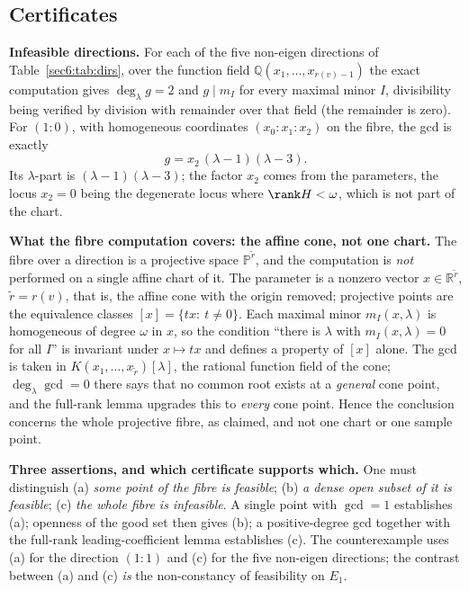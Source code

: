 \subsection{Certificates}\label{sec6:sub:cert}

\textbf{Infeasible directions.} For each of the five non-eigen directions of Table~\ref{sec6:tab:dirs},
over the function field $\mathbb{Q}(x_1,\dots,x_{r(v)-1})$ the exact computation gives
$\deg_\lambda g=2$ and $g\mid m_I$ for every maximal minor $I$, divisibility being verified by division
with remainder over that field (the remainder is zero). For $(1\!:\!0)$, with homogeneous coordinates
$(x_0\!:\!x_1\!:\!x_2)$ on the fibre, the gcd is exactly
\begin{equation}\label{sec6:eq:gexplicit}
g=x_2\,(\lambda-1)(\lambda-3).
\end{equation}
Its $\lambda$-part is $(\lambda-1)(\lambda-3)$; the factor $x_2$ comes from the parameters, the locus
$x_2=0$ being the degenerate locus where $\rank H<\omega$, which is not part of the chart.

\textbf{What the fibre computation covers: the affine cone, not one chart.} The fibre over a direction
is a projective space $\mathbb P^{\tilde r}$, and the computation is \emph{not} performed on a single
affine chart of it. The parameter is a nonzero vector $x\in\mathbb R^{\tilde r}$, $\tilde r=r(v)$, that is,
the affine cone with the origin removed; projective points are the equivalence classes
$[x]=\{tx:\ t\ne0\}$. Each maximal minor $m_I(x,\lambda)$ is homogeneous of degree $\omega$ in $x$, so
the condition ``there is $\lambda$ with $m_I(x,\lambda)=0$ for all $I$'' is invariant under
$x\mapsto tx$ and defines a property of $[x]$ alone. The gcd is taken in $K(x_1,\dots,x_{\tilde r})[\lambda]$,
the rational function field of the cone; $\deg_\lambda\gcd=0$ there says that no common root exists at
a \emph{general} cone point, and the full-rank lemma upgrades this to \emph{every} cone point. Hence the
conclusion concerns the whole projective fibre, as claimed, and not one chart or one sample point.

\textbf{Three assertions, and which certificate supports which.} One must distinguish
(a) \emph{some point of the fibre is feasible}; (b) \emph{a dense open subset of it is feasible};
(c) \emph{the whole fibre is infeasible}. A single point with $\gcd=1$ establishes (a); openness of the
good set then gives (b); a positive-degree gcd together with the full-rank leading-coefficient lemma
establishes (c). The counterexample uses (a) for the direction $(1\!:\!1)$ and (c) for the five
non-eigen directions; the contrast between (a) and (c) \emph{is} the non-constancy of feasibility on
$E_1$.

